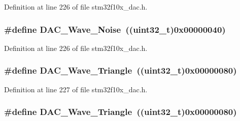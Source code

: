 Definition at line 226 of file stm32f10x\+\_\+dac.\+h.

\subsubsection[{\texorpdfstring{D\+A\+C\+\_\+\+Wave\+\_\+\+Noise}{DAC_Wave_Noise}}]{\setlength{\rightskip}{0pt plus 5cm}\#define D\+A\+C\+\_\+\+Wave\+\_\+\+Noise~(({\bf uint32\+\_\+t})0x00000040)}\hypertarget{group___d_a_c__wave__generation_ga09c5ee68f8e726b1c039df1f6e195965}{}\label{group___d_a_c__wave__generation_ga09c5ee68f8e726b1c039df1f6e195965}


Definition at line 226 of file stm32f10x\+\_\+dac.\+h.

\subsubsection[{\texorpdfstring{D\+A\+C\+\_\+\+Wave\+\_\+\+Triangle}{DAC_Wave_Triangle}}]{\setlength{\rightskip}{0pt plus 5cm}\#define D\+A\+C\+\_\+\+Wave\+\_\+\+Triangle~(({\bf uint32\+\_\+t})0x00000080)}\hypertarget{group___d_a_c__wave__generation_ga95a1566e1728e1e345e8f3b50629a075}{}\label{group___d_a_c__wave__generation_ga95a1566e1728e1e345e8f3b50629a075}


Definition at line 227 of file stm32f10x\+\_\+dac.\+h.

\subsubsection[{\texorpdfstring{D\+A\+C\+\_\+\+Wave\+\_\+\+Triangle}{DAC_Wave_Triangle}}]{\setlength{\rightskip}{0pt plus 5cm}\#define D\+A\+C\+\_\+\+Wave\+\_\+\+Triangle~(({\bf uint32\+\_\+t})0x00000080)}\hypertarget{group___d_a_c__wave__generation_ga95a1566e1728e1e345e8f3b50629a075}{}\label{group___d_a_c__wave__generation_ga95a1566e1728e1e345e8f3b50629a075}


